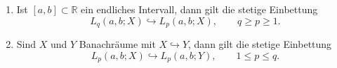 \begin{Lemma}[Eigenschaften]
    \begin{enumerate}
        \item Ist $[a, b] \subset \mathbb{R}$ ein endliches Intervall, dann gilt die stetige Einbettung
        \begin{equation}
            L_{q}(a, b; X) \hookrightarrow L_{p}(a, b; X), \qquad q \geq p \geq 1.
        \end{equation}
        \item Sind $X$ und $Y$ Banachräume mit $X \hookrightarrow Y$, dann gilt die stetige Einbettung
        \begin{equation}
            L_{p}(a, b; X) \hookrightarrow L_{p}(a, b; Y), \qquad 1 \leq p \leq q.
        \end{equation}
    \end{enumerate}
\end{Lemma}
